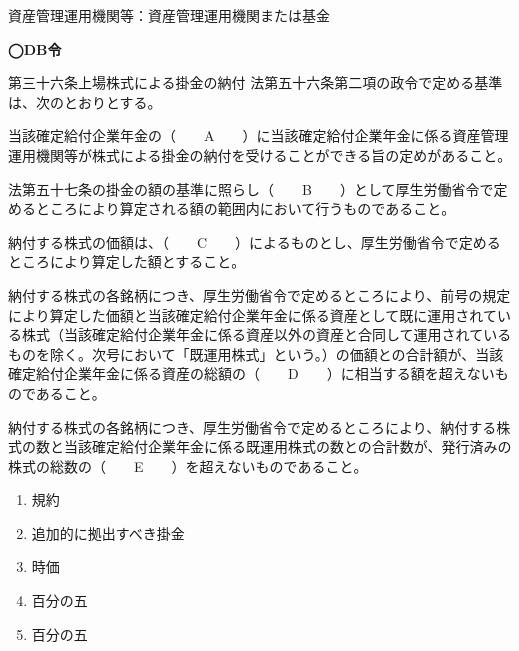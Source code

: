 \begin{explanationbox}
  資産管理運用機関等：資産管理運用機関または基金
\end{explanationbox}

\begin{fillblank}[自作 2026/11/7]
  \noindent \textbf{◯DB令}
  \begin{lawstructure}
    \begin{lawarticle}{第三十六条}{上場株式による掛金の納付}
      法第五十六条第二項の政令で定める基準は、次のとおりとする。

当該確定給付企業年金の（　　A　　）に当該確定給付企業年金に係る資産管理運用機関等が株式による掛金の納付を受けることができる旨の定めがあること。

法第五十七条の掛金の額の基準に照らし（　　B　　）として厚生労働省令で定めるところにより算定される額の範囲内において行うものであること。

納付する株式の価額は、（　　C　　）によるものとし、厚生労働省令で定めるところにより算定した額とすること。

納付する株式の各銘柄につき、厚生労働省令で定めるところにより、前号の規定により算定した価額と当該確定給付企業年金に係る資産として既に運用されている株式（当該確定給付企業年金に係る資産以外の資産と合同して運用されているものを除く。次号において「既運用株式」という。）の価額との合計額が、当該確定給付企業年金に係る資産の総額の（　　D　　）に相当する額を超えないものであること。

納付する株式の各銘柄につき、厚生労働省令で定めるところにより、納付する株式の数と当該確定給付企業年金に係る既運用株式の数との合計数が、発行済みの株式の総数の（　　E　　）を超えないものであること。

    \end{lawarticle}
  \end{lawstructure}
\end{fillblank}


\begin{answerbox}
    \begin{enumerate}[A: ]
    \item 規約
    \item 追加的に拠出すべき掛金
    \item 時価
    \item 百分の五
    \item 百分の五
  \end{enumerate}
\end{answerbox}

